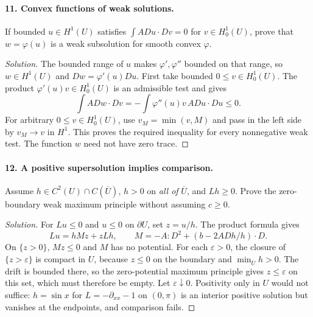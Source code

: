 \paragraph{11. Convex functions of weak solutions.}
If bounded $u\in H^1(U)$ satisfies
$\int A Du\cdot Dv=0$ for $v\in H^1_0(U)$, prove that
$w=\varphi(u)$ is a weak subsolution for smooth convex $\varphi$.
\begin{proof}[Solution]
The bounded range of $u$ makes $\varphi',\varphi''$ bounded on that range,
so $w\in H^1(U)$ and $Dw=\varphi'(u)Du$.
First take bounded $0\leq v\in H^1_0(U)$.
The product $\varphi'(u)v\in H^1_0(U)$ is an admissible test and gives
\[
 \int A Dw\cdot Dv
 =-\int \varphi''(u)v\, A Du\cdot Du\leq0 .
\]
For arbitrary $0\leq v\in H^1_0(U)$, use
$v_M=\min(v,M)$ and pass in the left side by $v_M\to v$ in $H^1$.
This proves the required inequality for every nonnegative weak test.
The function $w$ need not have zero trace.
\end{proof}
\Needspace{45mm}

\Needspace{30mm}
\paragraph{12. A positive supersolution implies comparison.}
Assume $h\in C^2(U)\cap C(\overline U)$,
$h>0$ on \emph{all of} $\overline U$, and $Lh\geq0$.
Prove the zero-boundary weak maximum principle without assuming $c\geq0$.
\begin{proof}[Solution]
For $Lu\leq0$ and $u\leq0$ on $\partial U$, set $z=u/h$.
The product formula gives
\[
 Lu=hMz+zLh,\qquad
 M=-A:D^2+(b-2ADh/h)\cdot D.
\]
On $\{z>0\}$, $Mz\leq0$ and $M$ has no potential.
For each $\varepsilon>0$, the closure of $\{z>\varepsilon\}$ is compact
in $U$, because $z\leq0$ on the boundary and $\min_{\overline U}h>0$.
The drift is bounded there, so the zero-potential maximum principle
gives $z\leq\varepsilon$ on this set, which must therefore be empty.
Let $\varepsilon\downarrow0$.
Positivity only in $U$ would not suffice:
$h=\sin x$ for $L=-\partial_{xx}-1$ on $(0,\pi)$ is an interior
positive solution but vanishes at the endpoints, and comparison fails.
\end{proof}

\Needspace{30mm}
